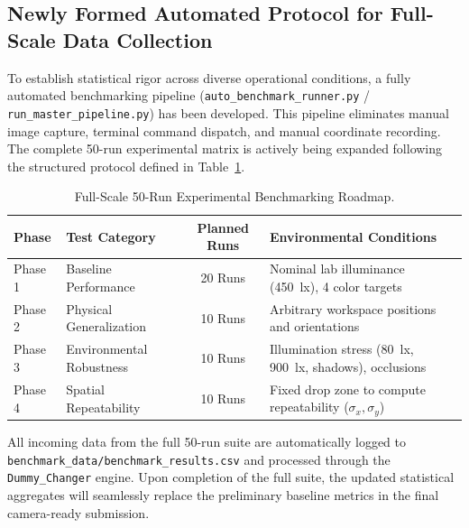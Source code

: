 \documentclass[runningheads]{llncs}
\begin{document}
\subsection*{Newly Formed Automated Protocol for Full-Scale Data Collection}
To establish statistical rigor across diverse operational conditions, a fully automated benchmarking pipeline (\texttt{auto\_benchmark\_runner.py} / \texttt{run\_master\_pipeline.py}) has been developed. This pipeline eliminates manual image capture, terminal command dispatch, and manual coordinate recording. The complete 50-run experimental matrix is actively being expanded following the structured protocol defined in Table~\ref{tab:protocol_roadmap}.

\begin{table}[h!]
\caption{Full-Scale 50-Run Experimental Benchmarking Roadmap.}
\label{tab:protocol_roadmap}
\centering
\begin{tabular}{llcl}
\toprule
\textbf{Phase} & \textbf{Test Category} & \textbf{Planned Runs} & \textbf{Environmental Conditions} \\
\midrule
Phase 1 & Baseline Performance & 20 Runs & Nominal lab illuminance (\SI{450}{\lux}), 4 color targets \\
Phase 2 & Physical Generalization & 10 Runs & Arbitrary workspace positions and orientations \\
Phase 3 & Environmental Robustness & 10 Runs & Illumination stress (\SI{80}{\lux}, \SI{900}{\lux}, shadows), occlusions \\
Phase 4 & Spatial Repeatability & 10 Runs & Fixed drop zone to compute repeatability ($\sigma_x, \sigma_y$) \\
\bottomrule
\end{tabular}
\end{table}

All incoming data from the full 50-run suite are automatically logged to \texttt{benchmark\_data/benchmark\_results.csv} and processed through the \texttt{Dummy\_Changer} engine. Upon completion of the full suite, the updated statistical aggregates will seamlessly replace the preliminary baseline metrics in the final camera-ready submission.
\end{document}
